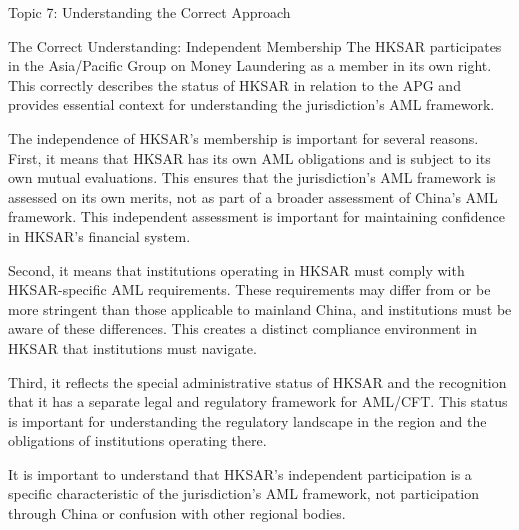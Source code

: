 \documentclass[5pt]{beamer}
\begin{document}
	\begin{frame}{Topic 7: Understanding the Correct Approach}
		\begin{block}{\tiny The Correct Understanding: Independent Membership}
			\tiny The HKSAR participates in the Asia/Pacific Group on Money Laundering as a member in its own right. This correctly describes the status of HKSAR in relation to the APG and provides essential context for understanding the jurisdiction's AML framework.
			
			The independence of HKSAR's membership is important for several reasons. First, it means that HKSAR has its own AML obligations and is subject to its own mutual evaluations. This ensures that the jurisdiction's AML framework is assessed on its own merits, not as part of a broader assessment of China's AML framework. This independent assessment is important for maintaining confidence in HKSAR's financial system.
			
			Second, it means that institutions operating in HKSAR must comply with HKSAR-specific AML requirements. These requirements may differ from or be more stringent than those applicable to mainland China, and institutions must be aware of these differences. This creates a distinct compliance environment in HKSAR that institutions must navigate.
			
			Third, it reflects the special administrative status of HKSAR and the recognition that it has a separate legal and regulatory framework for AML/CFT. This status is important for understanding the regulatory landscape in the region and the obligations of institutions operating there.
			
			It is important to understand that HKSAR's independent participation is a specific characteristic of the jurisdiction's AML framework, not participation through China or confusion with other regional bodies.
		\end{block}
	\end{frame}
	
\end{document}

